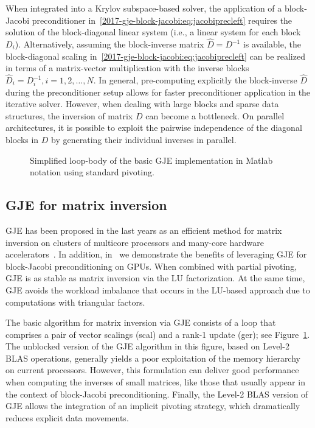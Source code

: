 When integrated into a Krylov subspace-based solver, 
the application of a block-Jacobi preconditioner in~\eqref{2017-gje-block-jacobi:eq:jacobiprecleft}
requires the solution of the block-diagonal linear system (i.e., a linear system
for each block $D_i$).
Alternatively, 
assuming the block-inverse matrix $\hat{D}=D^{-1}$
is available, the block-diagonal scaling in~\eqref{2017-gje-block-jacobi:eq:jacobiprecleft}
can be realized in terms of a matrix-vector multiplication with the inverse blocks
$\hat{D}_i=D_i^{-1}, i=1,2,\dots,N$.
In general, pre-computing explicitly the block-inverse $\hat{D}$ during the preconditioner setup 
allows for faster preconditioner application in the iterative solver.
However, when dealing with large blocks and 
sparse data structures, 
the inversion of matrix $D$ can become a bottleneck. 
On parallel architectures, it is possible to exploit the pairwise independence of the diagonal blocks in $D$
by generating their individual inverses in parallel.

\begin{figure}
\begin{center}
\begin{minipage}{\columnwidth}
{\small

}
\end{minipage}
\caption{Simplified loop-body of the basic GJE implementation in Matlab
    notation using standard pivoting.}
\label{2017-gje-block-jacobi:fig:gje}
\end{center}
\end{figure}
\subsection{GJE for matrix inversion}\label{2017-gje-block-jacobi:sec:gauss-jordan}

GJE has been proposed in the last years
as an efficient method for matrix inversion on 
clusters of multicore processors and many-core hardware accelerators~\cite{doi:10.1137/S1064827598345679,CPE:CPE2933}.
In addition, in~\cite{Anzt:2017:BGE:3026937.3026940} we demonstrate the benefits of {leveraging} GJE 
for block-Jacobi preconditioning on GPUs.
When combined with partial pivoting, GJE is as stable as matrix inversion via the LU factorization. 
At the same time, GJE avoids the workload imbalance that occurs in the LU-based approach 
{due to computations with}
triangular factors.

The basic algorithm for matrix inversion via GJE consists of
a loop that comprises a pair of vector scalings ({\sc scal}) and a rank-1
update ({\sc ger}); see Figure~\ref{2017-gje-block-jacobi:fig:gje}.
The unblocked version of the GJE algorithm in this figure, based
on Level-2 BLAS operations,
generally yields a poor exploitation of the memory hierarchy on current processors.
However, this formulation can
deliver good performance when computing the inverses of small matrices,
like {those that usually appear}
in the context of block-Jacobi preconditioning. 
Finally, the Level-2 BLAS version of GJE allows {the integration of} an implicit pivoting strategy,
which dramatically reduces explicit data movements.


